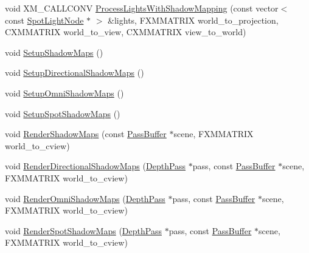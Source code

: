 \begin{DoxyCompactItemize}
\item 
void X\+M\+\_\+\+C\+A\+L\+L\+C\+O\+NV \hyperlink{structmage_1_1_l_buffer_pass_a569c16fc47d2f5d8d47af85cce2822e0}{Process\+Lights\+With\+Shadow\+Mapping} (const vector$<$ const \hyperlink{namespacemage_aeed5dee4ff6c591eabb0e9114256df4a}{Spot\+Light\+Node} $\ast$ $>$ \&lights, F\+X\+M\+M\+A\+T\+R\+IX world\+\_\+to\+\_\+projection, C\+X\+M\+M\+A\+T\+R\+IX world\+\_\+to\+\_\+view, C\+X\+M\+M\+A\+T\+R\+IX view\+\_\+to\+\_\+world)
\item 
void \hyperlink{structmage_1_1_l_buffer_pass_ac646805ddf0eb4d81be3e29fec539fc5}{Setup\+Shadow\+Maps} ()
\item 
void \hyperlink{structmage_1_1_l_buffer_pass_aa6a3dd241588a460e2ea51f6cec14aeb}{Setup\+Directional\+Shadow\+Maps} ()
\item 
void \hyperlink{structmage_1_1_l_buffer_pass_a530276d14da57710e5182abda48982d4}{Setup\+Omni\+Shadow\+Maps} ()
\item 
void \hyperlink{structmage_1_1_l_buffer_pass_a1ed3d550173e0145e363132656b8dfdb}{Setup\+Spot\+Shadow\+Maps} ()
\item 
void \hyperlink{structmage_1_1_l_buffer_pass_ad4c272e242ea28ca4a5c8c43d4c44112}{Render\+Shadow\+Maps} (const \hyperlink{structmage_1_1_pass_buffer}{Pass\+Buffer} $\ast$scene, F\+X\+M\+M\+A\+T\+R\+IX world\+\_\+to\+\_\+cview)
\item 
void \hyperlink{structmage_1_1_l_buffer_pass_ac6468c170742b5bee823235700ff640d}{Render\+Directional\+Shadow\+Maps} (\hyperlink{classmage_1_1_depth_pass}{Depth\+Pass} $\ast$pass, const \hyperlink{structmage_1_1_pass_buffer}{Pass\+Buffer} $\ast$scene, F\+X\+M\+M\+A\+T\+R\+IX world\+\_\+to\+\_\+cview)
\item 
void \hyperlink{structmage_1_1_l_buffer_pass_a621137906e2c04ddb029d2421c74d14f}{Render\+Omni\+Shadow\+Maps} (\hyperlink{classmage_1_1_depth_pass}{Depth\+Pass} $\ast$pass, const \hyperlink{structmage_1_1_pass_buffer}{Pass\+Buffer} $\ast$scene, F\+X\+M\+M\+A\+T\+R\+IX world\+\_\+to\+\_\+cview)
\item 
void \hyperlink{structmage_1_1_l_buffer_pass_a3dfd7e644661eda87c627d4795fd2ac9}{Render\+Spot\+Shadow\+Maps} (\hyperlink{classmage_1_1_depth_pass}{Depth\+Pass} $\ast$pass, const \hyperlink{structmage_1_1_pass_buffer}{Pass\+Buffer} $\ast$scene, F\+X\+M\+M\+A\+T\+R\+IX world\+\_\+to\+\_\+cview)
\end{DoxyCompactItemize}
